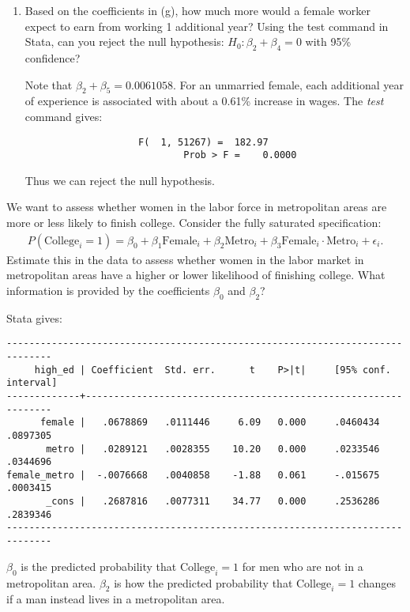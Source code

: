 \documentclass[11pt,twoside,openany]{memoir}
\begin{document}
\begin{question}
\begin{enumerate}[label = (\alph*),itemsep=1pt,topsep=3pt]
        \item Based on the coefficients in (g), how much more would a female worker expect to earn from working 1 additional year? Using the test command in Stata, can you reject the null hypothesis: $H_0:\beta_2 + \beta_4 = 0$ with 95\% confidence?
            {\color{blue} \begin{solution}
                Note that $\beta_2 + \beta_5 = 0.0061058$. For an unmarried female, each additional year of experience is associated with about a 0.61\% increase in wages. The \textit{test} command gives:
            \begin{Verbatim}
                    F(  1, 51267) =  182.97
                            Prob > F =    0.0000
            \end{Verbatim}
            \end{solution}}
            Thus we can reject the null hypothesis.
    \end{enumerate}
\end{question}
\begin{question}
    We want to assess whether women in the labor force in metropolitan areas are more or less likely to finish college. Consider the fully saturated specification:
        \begin{equation*}
        \begin{split}
            P(\text{College}_i = 1) = \beta_0 + \beta_1 \text{Female}_i + \beta_2 \text{Metro}_i + \beta_3 \text{Female}_i \cdot \text{Metro}_i + \epsilon_i.
        \end{split}
        \end{equation*}
    Estimate this in the data to assess whether women in the labor market in metropolitan areas have a higher or lower likelihood of finishing college. What information is provided by the coefficients $\beta_0$ and $\beta_2$?
\end{question}
    {\color{blue} \begin{solution}
        Stata gives:
            \begin{Verbatim}
------------------------------------------------------------------------------
     high_ed | Coefficient  Std. err.      t    P>|t|     [95% conf. interval]
-------------+----------------------------------------------------------------
      female |   .0678869   .0111446     6.09   0.000     .0460434    .0897305
       metro |   .0289121   .0028355    10.20   0.000     .0233546    .0344696
female_metro |  -.0076668   .0040858    -1.88   0.061     -.015675    .0003415
       _cons |   .2687816   .0077311    34.77   0.000     .2536286    .2839346
------------------------------------------------------------------------------
            \end{Verbatim}
        $\beta_0$ is the predicted probability that $\text{College}_i = 1$ for men who are not in a metropolitan area. $\beta_2$ is how the predicted probability that $\text{College}_i = 1$ changes if a man instead lives in a metropolitan area.
    \end{solution}}
\end{document}
